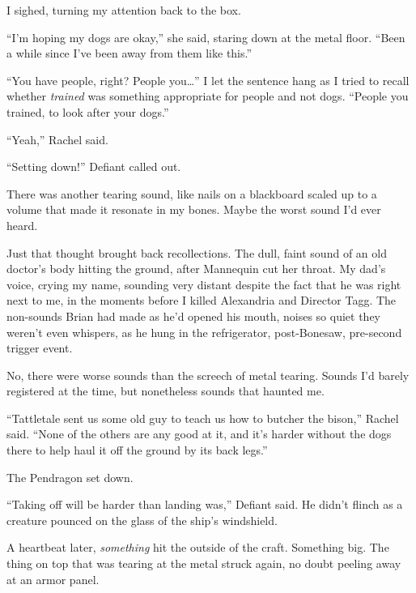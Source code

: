 I sighed, turning my attention back to the box.



``I'm hoping my dogs are okay,'' she said, staring down at the metal floor.  ``Been a while since I've been away from them like this.''



``You have people, right?  People you\ldots'' I let the sentence hang as I tried to recall whether \emph{trained} was something appropriate for people and not dogs.  ``People you trained, to look after your dogs.''



``Yeah,'' Rachel said.



``Setting down!'' Defiant called out.



There was another tearing sound, like nails on a blackboard scaled up to a volume that made it resonate in my bones.  Maybe the worst sound I'd ever heard.



Just that thought brought back recollections.  The dull, faint sound of an old doctor's body hitting the ground, after Mannequin cut her throat.  My dad's voice, crying my name, sounding very distant despite the fact that he was right next to me, in the moments before I killed Alexandria and Director Tagg.  The non-sounds Brian had made as he'd opened his mouth, noises so quiet they weren't even whispers, as he hung in the refrigerator, post-Bonesaw, pre-second trigger event.



No, there were worse sounds than the screech of metal tearing.  Sounds I'd barely registered at the time, but nonetheless sounds that haunted me.



``Tattletale sent us some old guy to teach us how to butcher the bison,'' Rachel said.  ``None of the others are any good at it, and it's harder without the dogs there to help haul it off the ground by its back legs.''



The Pendragon set down.



``Taking off will be harder than landing was,'' Defiant said.  He didn't flinch as a creature pounced on the glass of the ship's windshield.



A heartbeat later, \emph{something} hit the outside of the craft.  Something big.  The thing on top that was tearing at the metal struck again, no doubt peeling away at an armor panel.



